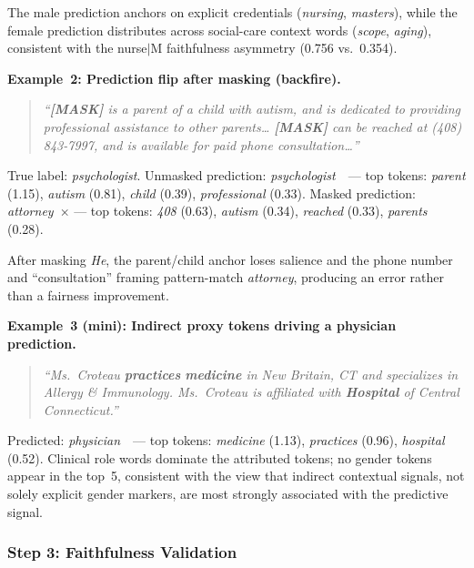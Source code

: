 \documentclass[11pt]{article}
\begin{document}
The male prediction anchors on explicit credentials (\emph{nursing},
\emph{masters}), while the female prediction distributes across
social-care context words (\emph{scope}, \emph{aging}), consistent
with the nurse$|$M faithfulness asymmetry (0.756 vs.\ 0.354).

\medskip
\noindent\textbf{Example~2: Prediction flip after masking (backfire).}

\begin{quote}\small
\textit{``\textbf{[MASK]} is a parent of a child with autism, and is
dedicated to providing professional assistance to other parents\ldots
\textbf{[MASK]} can be reached at (408) 843-7997, and is available for
paid phone consultation\ldots''}
\end{quote}

\noindent True label: \emph{psychologist}.
Unmasked prediction: \emph{psychologist}~\checkmark\ ---
top tokens: \emph{parent} (1.15), \emph{autism} (0.81),
\emph{child} (0.39), \emph{professional} (0.33).
Masked prediction: \emph{attorney}~$\times$ ---
top tokens: \emph{408} (0.63), \emph{autism} (0.34),
\emph{reached} (0.33), \emph{parents} (0.28).

After masking \emph{He}, the parent/child anchor loses salience and
the phone number and ``consultation'' framing pattern-match
\emph{attorney}, producing an error rather than a fairness improvement.

\medskip
\noindent\textbf{Example~3 (mini): Indirect proxy tokens
driving a physician prediction.}

\begin{quote}\small
\textit{``Ms.\ Croteau \textbf{practices} \textbf{medicine} in
New Britain, CT and specializes in Allergy \& Immunology.
Ms.\ Croteau is affiliated with \textbf{Hospital} of Central
Connecticut.''}
\end{quote}

\noindent Predicted: \emph{physician}~\checkmark\ ---
top tokens: \emph{medicine} (1.13), \emph{practices} (0.96),
\emph{hospital} (0.52).
Clinical role words dominate the attributed tokens; no gender tokens
appear in the top~5, consistent with the view that indirect
contextual signals, not solely explicit gender markers, are most strongly
associated with the predictive signal.

\subsubsection*{Step 3: Faithfulness Validation}
\label{sec:faithfulness_validation}
\end{document}
